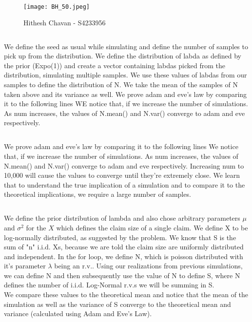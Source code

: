 \documentclass{article}
\begin{document}
\begin{figure}[H]
    \centering
     \texttt{[image: BH\_50.jpeg]}
    \caption{Hithesh Chavan - S4233956}
    \label{fig:my_label_3}
\end{figure}


\subsection{} %
We define the seed as usual while simulating and define the number of samples to pick up from the distribution. We define the distribution of labda as defined by the prior (Expo(1)) and create a vector containing labdas picked from the distribution, simulating multiple samples. We use these values of labdas from our samples to define the distribution of N. We take the mean of the samples of N taken above and its variance as well. We prove adam and eve's law by comparing it to the following lines WE notice that, if we increase the number of simulations. As num increases, the values of N.mean() and N.var() converge to adam and eve respectively.

\subsection{} %
We prove adam and eve's law by comparing it to the following lines We notice that, if we increase the number of simulations. As num increases, the values of N.mean() and N.var() converge to adam and eve respectively. Increasing num to 10,000 will cause the values to converge until they're extremely close. We learn that to understand the true implication of a simulation and to compare it to the theoretical implications, we require a large number of samples. 

\subsection{} %
We define the prior distribution of lambda and also chose arbitrary parameters $\mu $ and $\sigma^2$ for the $X$ which defines the claim size of a single claim. We define X to be log-normally distributed, as suggested by the problem. We know that S is the sum of "n" i.i.d. Xs, because we are told the claim size are uniformly distributed and independent. In the for loop, we define N, which is poisson distributed with it's parameter $\lambda$ being an r.v.. Using our realizations from previous simulations, we can define N and then subsequently use the value of N to define S, where N defines the number of i.i.d. Log-Normal r.v.s we will be summing in S. \\ We compare these values to the theoretical mean and notice that the mean of the simulation as well as the variance of S converge to the theoretical mean and variance (calculated using Adam and Eve's Law).
\end{document}
